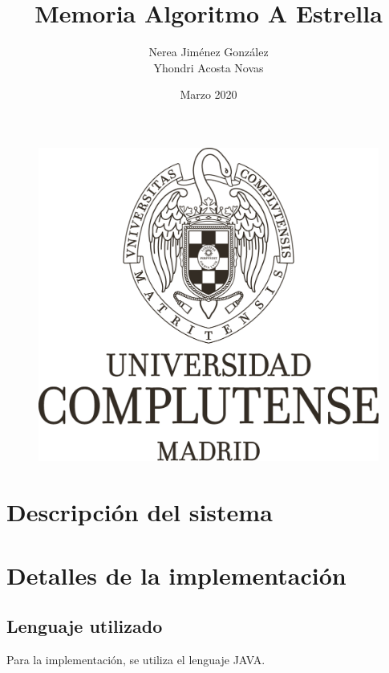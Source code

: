 \documentclass[es]{article}
\title{Memoria Algoritmo A Estrella}
\author{Nerea Jiménez González\\ Yhondri Acosta Novas}
\date{Marzo 2020}
\begin{document}
\maketitle
\begin{figure}[H]
    \centering
    \includegraphics[width=1\textwidth]{3-2016-07-21-Marca UCM Monocromo Negro.png}
\end{figure}

\newpage
\tableofcontents
\newpage

\section{Descripción del sistema}
\section{Detalles de la implementación}
\subsection{Lenguaje utilizado}
Para la implementación, se utiliza el lenguaje JAVA.
\end{document}
